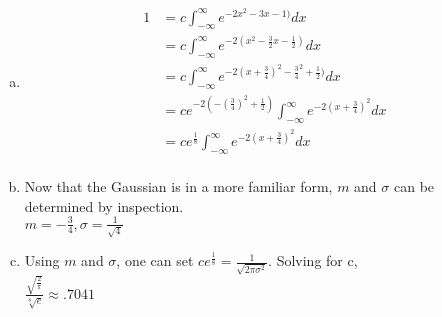 \documentclass[12pt]{article}
\newenvironment{problem}[2][Problem]{\begin{trivlist}
\item[\hskip \labelsep {\bfseries #1}\hskip \labelsep {\bfseries #2.}]
  \vspace{1 cm}
}{\end{trivlist}}
\begin{document}
\begin{problem}{3.21}
\item
  \begin{enumerate}[a.]
    \item %
      \begin{align*}
        1 &= c \int_{-\infty}^{\infty} e^{-2x^2 -3x-1)}dx \\
        &= c \int_{-\infty}^{\infty} e^{-2(x^2 -\frac{3}{2}x-\frac{1}{2})}dx \\
        &= c \int_{-\infty}^{\infty} e^{-2(x +\frac{3}{4})^2-\frac{3}{4}^2+\frac{1}{2})}dx \\
        &= ce^{-2\left(-(\frac{3}{4})^2+\frac{1}{2}\right)} \int_{-\infty}^{\infty} e^{-2(x +\frac{3}{4})^2}dx \\
        &= ce^{\frac{1}{8}} \int_{-\infty}^{\infty} e^{-2(x +\frac{3}{4})^2}dx \\
      \end{align*}
    \item %
      Now that the Gaussian is in a more familiar form, $m$ and $\sigma$ can be
      determined by inspection. \\
      $m = -\frac{3}{4}, \sigma = \frac{1}{\sqrt{4}}$
    \item %
      Using $m$ and $\sigma$, one can set $ce^{\frac{1}{8}}= \frac{1}{\sqrt{2\pi\sigma^2}}$.
      Solving for c,\\
      $\frac{\sqrt{\frac{2}{\pi}}}{\sqrt[8]{e}} \approx .7041$
  \end{enumerate}
\end{problem}
\end{document}
